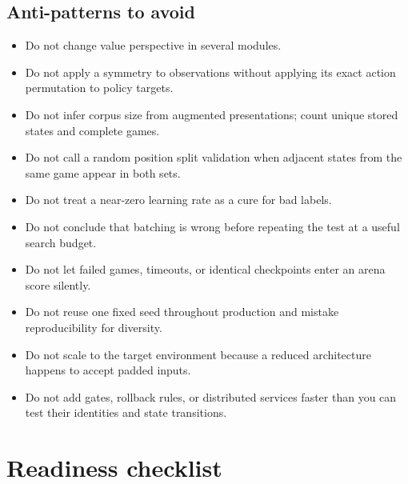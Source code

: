 \documentclass[10.5pt,letterpaper]{article}
\begin{document}
\subsection{Anti-patterns to avoid}
\begin{itemize}
  \item Do not change value perspective in several modules.
  \item Do not apply a symmetry to observations without applying its exact
        action permutation to policy targets.
  \item Do not infer corpus size from augmented presentations; count unique
        stored states and complete games.
  \item Do not call a random position split validation when adjacent states
        from the same game appear in both sets.
  \item Do not treat a near-zero learning rate as a cure for bad labels.
  \item Do not conclude that batching is wrong before repeating the test at a
        useful search budget.
  \item Do not let failed games, timeouts, or identical checkpoints enter an
        arena score silently.
  \item Do not reuse one fixed seed throughout production and mistake
        reproducibility for diversity.
  \item Do not scale to the target environment because a reduced architecture
        happens to accept padded inputs.
  \item Do not add gates, rollback rules, or distributed services faster than
        you can test their identities and state transitions.
\end{itemize}

\section{Readiness checklist}
\end{document}
